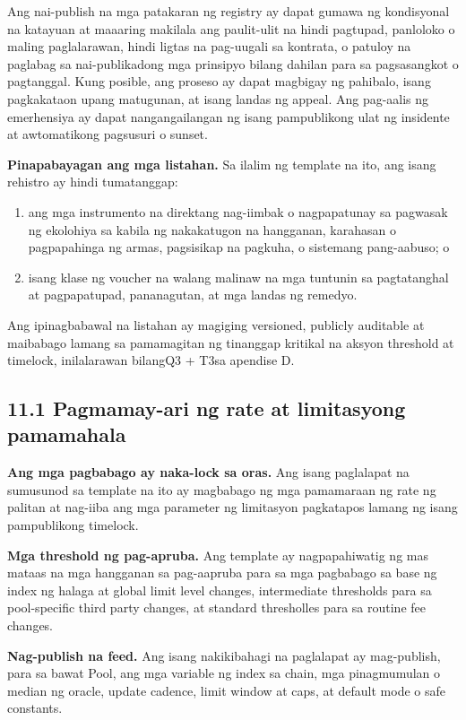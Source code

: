 \documentclass[11pt]{article}
\begin{document}
Ang nai-publish na mga patakaran ng registry ay dapat gumawa ng kondisyonal na katayuan at maaaring makilala ang paulit-ulit na hindi pagtupad, panloloko o maling paglalarawan, hindi ligtas na pag-uugali sa kontrata, o patuloy na paglabag sa nai-publikadong mga prinsipyo bilang dahilan para sa pagsasangkot o pagtanggal. Kung posible, ang proseso ay dapat magbigay ng pahibalo, isang pagkakataon upang matugunan, at isang landas ng appeal. Ang pag-aalis ng emerhensiya ay dapat nangangailangan ng isang pampublikong ulat ng insidente at awtomatikong pagsusuri o sunset.

\textbf{Pinapabayagan ang mga listahan.} Sa ilalim ng template na ito, ang isang rehistro ay hindi tumatanggap:

\begin{enumerate}[leftmargin=*]
\item ang mga instrumento na direktang nag-iimbak o nagpapatunay sa pagwasak ng ekolohiya sa kabila ng nakakatugon na hangganan, karahasan o pagpapahinga ng armas, pagsisikap na pagkuha, o sistemang pang-aabuso; o
\item isang klase ng voucher na walang malinaw na mga tuntunin sa pagtatanghal at pagpapatupad, pananagutan, at mga landas ng remedyo.
\end{enumerate}
Ang ipinagbabawal na listahan ay magiging versioned, publicly auditable at maibabago lamang sa pamamagitan ng tinanggap kritikal na aksyon threshold at timelock, inilalarawan bilangQ3 + T3sa apendise D.

\subsection*{11.1 Pagmamay-ari ng rate at limitasyong pamamahala}

\textbf{Ang mga pagbabago ay naka-lock sa oras.} Ang isang paglalapat na sumusunod sa template na ito ay magbabago ng mga pamamaraan ng rate ng palitan at nag-iiba ang mga parameter ng limitasyon pagkatapos lamang ng isang pampublikong timelock.

\textbf{Mga threshold ng pag-apruba.} Ang template ay nagpapahiwatig ng mas mataas na mga hangganan sa pag-aapruba para sa mga pagbabago sa base ng index ng halaga at global limit level changes, intermediate thresholds para sa pool-specific third party changes, at standard thresholles para sa routine fee changes.

\textbf{Nag-publish na feed.} Ang isang nakikibahagi na paglalapat ay mag-publish, para sa bawat Pool, ang mga variable ng index sa chain, mga pinagmumulan o median ng oracle, update cadence, limit window at caps, at default mode o safe constants.
\end{document}
